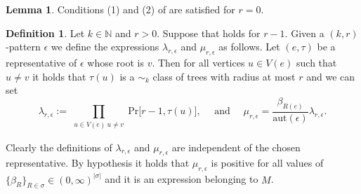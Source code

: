 \documentclass[12pt,notitlepage,a4paper]{article}
\theoremstyle{definition}
\newtheorem{lemma}{Lemma}[section]
\newtheorem{definition}{Definition}[section]
\newcommand{\N}{\mathbb{N}}
\newcommand{\aut}{\mathrm{aut}}
\begin{document}
\begin{lemma}
	Conditions (1) and (2) of  
	are satisfied for $r=0$.
\end{lemma}

\begin{definition}
	Let $k\in \N$ and $r>0$. 
	Suppose that  holds for $r-1$.
	Given a $(k,r)$-pattern $\epsilon$ we define the expressions
	$\lambda_{r,\epsilon}$ and $\mu_{r,\epsilon}$ as follows.
	Let $(e,\tau)$ be a representative of $\epsilon$
	whose root is $v$. Then for all vertices $u\in V(e)$ such that
	$u\neq v$ it holds that $\tau(u)$ is a $\sim_k$ class of trees with
	radius at most $r$ and we can set  
	\[
	\lambda_{r,\epsilon}:=\prod_{\substack{u\in V(e)\ u\neq v} } \mathrm{Pr}\big[
	r-1, \tau(u)\big], \quad \text{ and } \quad
	\mu_{r,\epsilon}=\frac{\beta_{R(e)}}{\aut(\epsilon)} 
	  \lambda_{r,\epsilon}.
	\]
\end{definition}	
Clearly the definitions of $\lambda_{r,\epsilon}$ and
$\mu_{r,\epsilon}$ are independent of the chosen representative.
By hypothesis it holds
that $\mu_{r,\epsilon}$ is positive for all values of
$\{ \beta_R \}_{R\in \sigma}\in (0,\infty)^{|\sigma|}$
and it is an expression belonging to $M$.
\end{document}
